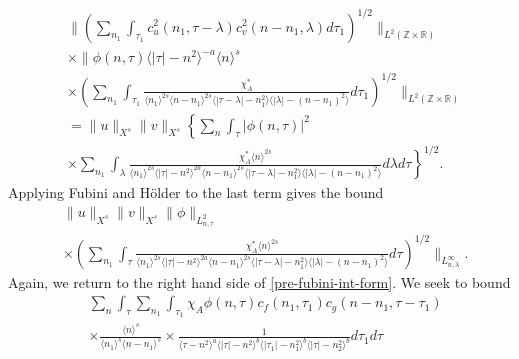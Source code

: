 \documentclass[12pt,reqno]{amsart}
\numberwithin{equation}{section}  %
\newcommand{\rr}{\mathbb{R}}
\newcommand{\zz}{\mathbb{Z}}
\begin{document}
%
%
\begin{equation*}
  \begin{split}
    & \|\left( \sum_{n_{1} }\int_{\tau_{1} } c_{u}^{2}(n_1, \tau - \lambda)
  c_{v}^{2} (n - n_1, \lambda ) d \tau_1  \right)^{1/2} \|_{L^{2}(\zz \times
		\rr)}
		\\
    & \times  \|\phi(n, \tau) \langle | \tau | - n^{2} \rangle ^{-a} \langle n
    \rangle ^{s}
		\\
    & \times \left( \sum_{n_{1}} \int_{\tau_{1}} \frac{\chi^{*}_{A}}{ \langle n_{1}
    \rangle ^{2s} \langle n-n_{1} \rangle ^{2s} \langle | \tau - \lambda|-n_{1}^{2}
    \rangle \langle  |\lambda | -(n - n_{1})^{2}
    \rangle } d \tau_1 \right)^{1/2} \|_{L^2(\zz \times \rr)}
		\\
    & = \|u\|_{X^{s}} \|v\|_{X^{s}} \label{holder-term*}
    \left \{ \sum_{n} \int_{\tau} |\phi(n, \tau)|^{2} \right .
    \\
    & \left. \times \sum_{n_{1}} \int_{\lambda} \frac{\chi^{*}_{A}
    \langle n \rangle ^{2s}
    }{ \langle n_{1} \rangle^{2s} \langle | \tau | - n^{2}
    \rangle ^{2a}  \langle
n-n_{1} \rangle ^{2s}  \langle | \tau - \lambda|-n_{1}^{2}
\rangle \langle  | \lambda | -(n - n_{1})^{2}
    \rangle } d \lambda d \tau \right \}^{1/2}.
  \end{split}
\end{equation*}
%
%
Applying Fubini and H{\"o}lder to the last term gives the bound
%
%
\begin{equation}
  \label{integral-bound-1st-form-per*}
	\begin{split}
    & \|u\|_{X^{s}} \|v\|_{X^{s}} \| \phi \|_{L^{2}_{n, \tau}}
    \\
    & \times \left( \sum_{n_{1}} \int_{\tau} \frac{\chi^{*}_{A}
    \langle n \rangle ^{2s}
    }{ \langle n_{1} \rangle^{2s} \langle | \tau | - n^{2}
    \rangle ^{2a}  \langle
n-n_{1} \rangle ^{2s}  \langle | \tau - \lambda|-n_{1}^{2}
\rangle \langle  | \lambda | -(n - n_{1})^{2}
    \rangle } d \tau  \right)^{1/2} \|_{L^\infty_{n, \lambda}}.
	\end{split}
\end{equation}
Again, we return to the right hand side of \eqref{pre-fubini-int-form}.
We seek to bound
\begin{equation*}
\begin{split}
  & \sum_{n} \int_{\tau}  \sum_{n_{1} }
  \int_{\tau_{1}} \chi_{A} \phi(n, \tau)
    c_f(n_1, \tau_1)
		c_g(n - n_1, \tau - \tau_1 )
		\\
    & \times \frac{\langle n \rangle ^{s}}{\langle n_{1} \rangle ^{s} \langle
    n-n_{1} \rangle ^{s}} \times \frac{1}{ \langle \tau - n^{2} \rangle^{a}
\langle |\tau| - n^{2} \rangle
    ^{b}\langle |\tau_{1}|-n_{1}^{2} \rangle ^{b}\langle | \tau|-n_{2}^{2}
    \rangle ^{b}} d \tau_1 d \tau 
   \end{split}
\end{equation*}
\end{document}
